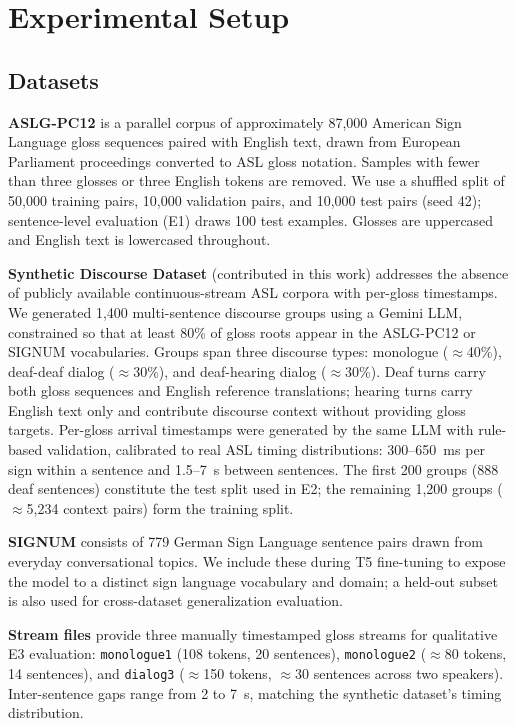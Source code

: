 \documentclass[conference]{IEEEtran}
\begin{document}
\section{Experimental Setup}

\subsection{Datasets}

\textbf{ASLG-PC12} \cite{othman2012english} is a parallel corpus of approximately 87,000 American Sign Language gloss sequences paired with English text, drawn from European Parliament proceedings converted to ASL gloss notation. Samples with fewer than three glosses or three English tokens are removed. We use a shuffled split of 50,000 training pairs, 10,000 validation pairs, and 10,000 test pairs (seed 42); sentence-level evaluation (E1) draws 100 test examples. Glosses are uppercased and English text is lowercased throughout.

\textbf{Synthetic Discourse Dataset} (contributed in this work) addresses the absence of publicly available continuous-stream ASL corpora with per-gloss timestamps. We generated 1,400 multi-sentence discourse groups using a Gemini LLM, constrained so that at least 80\% of gloss roots appear in the ASLG-PC12 or SIGNUM vocabularies. Groups span three discourse types: monologue ($\approx$40\%), deaf-deaf dialog ($\approx$30\%), and deaf-hearing dialog ($\approx$30\%). Deaf turns carry both gloss sequences and English reference translations; hearing turns carry English text only and contribute discourse context without providing gloss targets. Per-gloss arrival timestamps were generated by the same LLM with rule-based validation, calibrated to real ASL timing distributions: 300--650~ms per sign within a sentence and 1.5--7~s between sentences. The first 200 groups (888 deaf sentences) constitute the test split used in E2; the remaining 1,200 groups ($\approx$5,234 context pairs) form the training split.

\textbf{SIGNUM} consists of 779 German Sign Language sentence pairs drawn from everyday conversational topics. We include these during T5 fine-tuning to expose the model to a distinct sign language vocabulary and domain; a held-out subset is also used for cross-dataset generalization evaluation.

\textbf{Stream files} provide three manually timestamped gloss streams for qualitative E3 evaluation: \texttt{monologue1} (108 tokens, 20 sentences), \texttt{monologue2} ($\approx$80 tokens, 14 sentences), and \texttt{dialog3} ($\approx$150 tokens, $\approx$30 sentences across two speakers). Inter-sentence gaps range from 2 to 7~s, matching the synthetic dataset's timing distribution.
\end{document}
